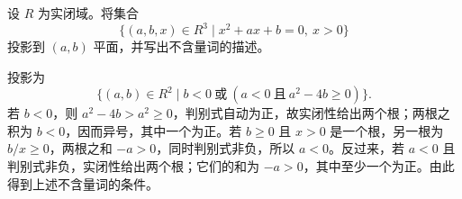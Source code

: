 \begin{exercise}\label{b1:ex:E-projection-quadratic}
	设 \(R\) 为实闭域。将集合
	\[
		\{(a,b,x)\in R^3\mid x^2+ax+b=0,\ x>0\}
	\]
	投影到 \((a,b)\) 平面，并写出不含量词的描述。
\end{exercise}

\begin{solution}
	投影为
	\[
		\{(a,b)\in R^2\mid b<0\ \text{或}\ (a<0\ \text{且}\ a^2-4b\geq0)\}.
	\]
	若 \(b<0\)，则 \(a^2-4b>a^2\geq0\)，判别式自动为正，故实闭性给出两个根；两根之积为 \(b<0\)，因而异号，其中一个为正。若 \(b\geq0\) 且 \(x>0\) 是一个根，另一根为 \(b/x\geq0\)，两根之和 \(-a>0\)，同时判别式非负，所以 \(a<0\)。反过来，若 \(a<0\) 且判别式非负，实闭性给出两个根；它们的和为 \(-a>0\)，其中至少一个为正。由此得到上述不含量词的条件。
\end{solution}
